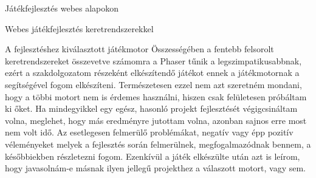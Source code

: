 \begin{MyChapter}{Játékfejlesztés webes alapokon}
\begin{MySection}{Webes játékfejlesztés keretrendszerekkel}
		\begin{MySubSection}{A fejlesztéshez kiválasztott játékmotor}		
			Összességében a fentebb felsorolt keretrendszereket összevetve számomra a Phaser tűnik a legszimpatikusabbnak, ezért a szakdolgozatom részeként elkészítendő játékot ennek a játékmotornak a segítségével fogom elkészíteni. Természetesen ezzel nem azt szeretném mondani, hogy a többi motort nem is érdemes használni, hiszen csak felületesen próbáltam ki őket. Ha mindegyikkel egy egész, hasonló projekt fejlesztését végigcsináltam volna, meglehet, hogy más eredményre jutottam volna, azonban sajnos erre most nem volt idő.
			Az esetlegesen felmerülő problémákat, negatív vagy épp pozitív véleményeket melyek a fejlesztés során felmerülnek, megfogalmazódnak bennem, a későbbiekben részletezni fogom. Ezenkívül a játék elkészülte után azt is leírom, hogy javasolnám-e másnak ilyen jellegű projekthez a válaszott motort, vagy sem.
		\end{MySubSection}

	\end{MySection}
	
\end{MyChapter}